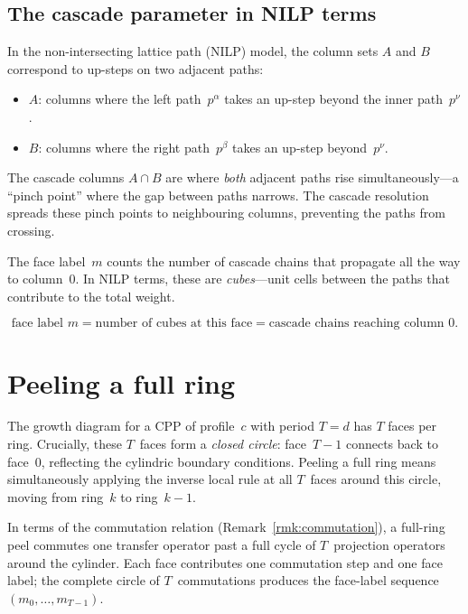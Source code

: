 \documentclass[11pt]{article}
\theoremstyle{plain}
\theoremstyle{definition}
\begin{document}
\subsection{The cascade parameter in NILP terms}
\label{sec:cascade-nilp}

In the non-intersecting lattice path (NILP) model, the column sets
$A$ and $B$ correspond to up-steps on two adjacent paths:
\begin{itemize}
  \item $A$: columns where the left path~$p^{\alpha}$ takes an
    up-step beyond the inner path~$p^{\nu}$.
  \item $B$: columns where the right path~$p^{\beta}$ takes an
    up-step beyond~$p^{\nu}$.
\end{itemize}

The cascade columns $A \cap B$ are where \emph{both} adjacent paths
rise simultaneously---a ``pinch point'' where the gap between paths
narrows.  The cascade resolution spreads these pinch points to
neighbouring columns, preventing the paths from crossing.

The face label~$m$ counts the number of cascade chains that propagate
all the way to column~$0$.  In NILP terms, these are
\emph{cubes}---unit cells between the paths that contribute to the
total weight.

\begin{equation}\label{eq:face-cubes}
  \boxed{\;
  \text{face label } m
  = \text{number of cubes at this face}
  = \text{cascade chains reaching column } 0.
  \;}
\end{equation}


\section{Peeling a full ring}
\label{sec:full-peel}

The growth diagram for a CPP of profile~$c$ with period $T = d$ has
$T$ faces per ring.  Crucially, these $T$~faces form a \emph{closed
circle}: face~$T-1$ connects back to face~$0$, reflecting the
cylindric boundary conditions.  Peeling a full ring means
simultaneously applying the inverse local rule at all $T$~faces
around this circle, moving from ring~$k$ to ring~$k-1$.

In terms of the commutation relation
(Remark~\ref{rmk:commutation}), a full-ring peel commutes one
transfer operator past a full cycle of $T$~projection operators
around the cylinder.  Each face contributes one commutation step
and one face label; the complete circle of $T$~commutations
produces the face-label sequence $(m_0, \ldots, m_{T-1})$.
\end{document}
